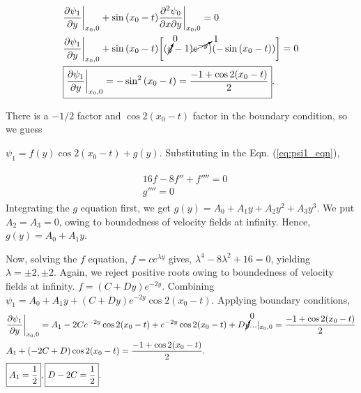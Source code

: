 \documentclass{article}
\begin{document}
\begin{align}\label{eq:psi1_y}
 \begin{split}
 &  \frac{\partial \psi_{1}}{\partial y }\bigg|_{x_{0}, 0} + \sin{(x_{0}-t)} \frac{\partial^{2} \psi_{0}}{\partial x \partial y}\bigg|_{x_{0}, 0}= 0\\
 &  \frac{\partial \psi_{1}}{\partial y }\bigg|_{x_{0}, 0} + \sin{(x_{0}-t)} \bigg[(\cancelto{0}{y}-1)\cancelto{1}{e^{-y}})(-\sin{(x_{0}-t)})\bigg] = 0\\
 & \boxed{\frac{\partial \psi_{1}}{\partial y }\bigg|_{x_{0}, 0} = -\sin^{2}{(x_{0}-t)} = \frac{-1 + \cos{2(x_{0}-t)} }{2}}.
 \end{split}
\end{align}

There is a $-1/2$ factor and $\cos{2(x_{0}-t)} $ factor in the boundary condition, so we guess 

$\boxed{\psi_{1} = f(y) \cos{2(x_{0}-t)} + g(y)}$. Substituting in the Eqn. (\ref{eq:psi1_eqn}), 

\begin{align}
 \begin{split}
  & 16f - 8f'' + f'''' = 0\\
  & g'''' = 0
 \end{split}
\end{align}
Integrating the $g$ equation first, we get 
$g(y) = A_{0} + A_{1}y + A_{2}y^{2} + A_{3}y^{3}$. We put $A_{2} = A_{3} = 0$, owing to boundedness of velocity fields at infinity. Hence, $\boxed{g(y) = A_{0} + A_{1}y}$.

Now, solving the $f$ equation, $f = ce^{\lambda y}$ gives, $\lambda^{4} - 8 \lambda^{2} + 16 = 0$, yielding $\lambda = \pm 2, \pm 2$. Again, we reject positive roots owing to boundedness of velocity fields at infinity. $\boxed{f = (C+Dy)e^{-2y}}$.
Combining $\boxed{\psi_{1}  = A_{0} + A_{1}y + (C+Dy)e^{-2y} \cos{2(x_{0}-t)} }$.
Applying boundary conditions, 
\begin{align}
 \begin{split}
  &\frac{\partial \psi_{1}}{\partial y }\bigg|_{x_{0}, 0} = A_{1} - 2C e^{-2y} \cos{2(x_{0}-t)} + e^{-2y} \cos{2(x_{0}-t)} + D\cancelto{0}{y}...|_{x_{0}, 0} = \frac{-1 + \cos{2(x_{0}-t)} }{2}\\
  & A_{1} + (-2C+D)\cos{2(x_{0}-t)} = \frac{-1 + \cos{2(x_{0}-t)} }{2}.\\
  & \boxed{A_{1} = \frac{1}{2}}, \boxed{D-2C =\frac{1}{2}}.
 \end{split}
\end{align}
\end{document}
